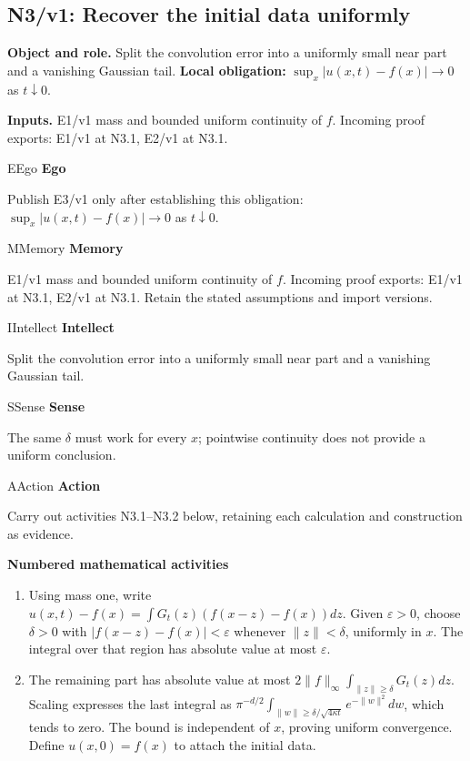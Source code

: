 \documentclass[preprint,12pt,aps,pra,showkeys,amsmath,amssymb,superscriptaddress,floatfix]{revtex4-2}
\theoremstyle{definition}
\theoremstyle{remark}
\newcommand{\mmfaculty}[3]{%
 \begin{mmfacultybox}{#1}{#2}
 {\sffamily\bfseries\color{MMBlue}#2}\par\smallskip #3
 \end{mmfacultybox}}
\newcommand{\field}[2]{\par\smallskip\noindent\textbf{#1.} #2\par}
\begin{document}
\clearpage

\subsection{N3/v1: Recover the initial data uniformly}

\field{Object and role}{Split the convolution error into a uniformly small near part and a
vanishing Gaussian tail. \textbf{Local obligation:}
\(\sup_x|u(x,t)-f(x)|\to0\) as \(t\downarrow0\).}

\field{Inputs}{E1/v1 mass and bounded uniform continuity of \(f\). Incoming proof
exports: E1/v1 at N3.1, E2/v1 at N3.1.}

\mmfaculty{E}{Ego}{Publish E3/v1 only after establishing this obligation:
\(\sup_x|u(x,t)-f(x)|\to0\) as \(t\downarrow0\).}

\mmfaculty{M}{Memory}{E1/v1 mass and bounded uniform continuity of \(f\). Incoming proof
exports: E1/v1 at N3.1, E2/v1 at N3.1. Retain the stated assumptions and
import versions.}

\mmfaculty{I}{Intellect}{Split the convolution error into a uniformly small near part and a
vanishing Gaussian tail.}

\mmfaculty{S}{Sense}{The same \(\delta\) must work for every \(x\); pointwise continuity does
not provide a uniform conclusion.}

\mmfaculty{A}{Action}{Carry out activities N3.1--N3.2 below, retaining each calculation and
construction as evidence.}

\smallskip\noindent\textbf{Numbered mathematical activities}

\begin{enumerate}[label=N3.\arabic*,leftmargin=3.4em]

\item Using mass one, write \(u(x,t)-f(x)=\int G_t(z)(f(x-z)-f(x))dz\). Given
\(\varepsilon>0\), choose \(\delta>0\) with
\(|f(x-z)-f(x)|<\varepsilon\) whenever \(\|z\|<\delta\), uniformly in
\(x\). The integral over that region has absolute value at most
\(\varepsilon\).

\item The remaining part has absolute value at most
\(2\|f\|_\infty\int_{\|z\|\ge\delta}G_t(z)dz\). Scaling expresses the
last integral as
\(\pi^{-d/2}\int_{\|w\|\ge\delta/\sqrt{4\kappa t}}e^{-\|w\|^2}dw\),
which tends to zero. The bound is independent of \(x\), proving uniform
convergence. Define \(u(x,0)=f(x)\) to attach the initial data.

\end{enumerate}
\end{document}
